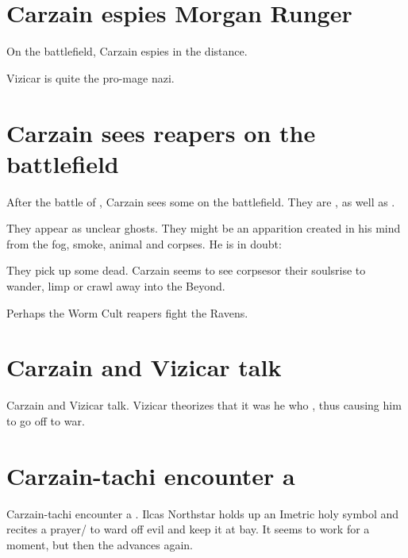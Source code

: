 \section{Carzain espies Morgan Runger}
On the battlefield, Carzain espies  in the distance. 


Vizicar is quite the pro-mage nazi. 







\section{Carzain sees reapers on the battlefield}
After the battle of \Forclin, Carzain sees some  on the battlefield. They are , as well as . 

They appear as unclear ghosts. They might be an apparition created in his mind from the fog, smoke, animal and corpses. He is in doubt: 

They pick up some dead. Carzain seems to see corpses\dash or their souls\dash rise to wander, limp or crawl away into the Beyond. 

Perhaps the Worm Cult reapers fight the Ravens. 





\section{Carzain and Vizicar talk}
Carzain and Vizicar talk. 
Vizicar theorizes that it was he who , thus causing him to go off to war. 





\section{Carzain-tachi encounter a \bane}
Carzain-tachi encounter a \bane. 
Ilcas Northstar holds up an Imetric holy symbol and recites a prayer/ to ward off evil and keep it at bay. 
It seems to work for a moment, but then the \bane{} advances again. 





